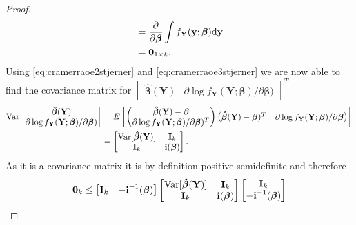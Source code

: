 \begin{proof}
\begin{align}
    &=\frac{\partial}{\partial \boldsymbol{\beta}} \int f_\textbf{Y}(\textbf{y};\boldsymbol{\beta}) \text{d\textbf{y}} \nonumber \\
    &= \textbf{0}_{1 \times k} \label{eq:cramerraoe3stjerner}.
\end{align}
Using \eqref{eq:cramerraoe2stjerner} and \eqref{eq:cramerraoe3stjerner} we are now able to find the covariance matrix for $\begin{bmatrix} \boldsymbol{\hat{\beta}}(\textbf{Y}) & \partial \log f_\textbf{Y}(\textbf{Y};\boldsymbol{\beta})/\partial \boldsymbol{\beta}) \end{bmatrix}^T$
\begin{align*}
    \operatorname{\text{Var}} \begin{bmatrix}  \boldsymbol{\hat{\beta}}(\textbf{Y}) \\  \partial \log f_\textbf{Y}(\textbf{Y};\boldsymbol{\beta})/\partial \boldsymbol{\beta}) \end{bmatrix} &= E \begin{bmatrix} \begin{pmatrix} \boldsymbol{\hat{\beta}}(\textbf{Y})-\boldsymbol{\beta} \\  \partial \log f_\textbf{Y}(\textbf{Y};\boldsymbol{\beta})/\partial \boldsymbol{\beta})^T\end{pmatrix} \begin{pmatrix} \boldsymbol{\hat{\beta}}(\textbf{Y})-\boldsymbol{\beta})^T &  \partial \log f_\textbf{Y}(\textbf{Y};\boldsymbol{\beta})/\partial \boldsymbol{\beta} \end{pmatrix}\end{bmatrix}  \\
    &= \begin{bmatrix} \operatorname{\text{Var}}[\boldsymbol{\hat{\beta}}(\textbf{Y})] & \textbf{I}_{k}\\
    \textbf{I}_{k} & \textbf{i}(\boldsymbol{\beta})\end{bmatrix}.
\end{align*}
As it is a covariance matrix it is by definition positive semidefinite and therefore
\begin{align*}
    \textbf{0}_{k} & \leq \begin{bmatrix} \textbf{I}_{k} & -\textbf{i}^{-1}(\boldsymbol{\beta})\end{bmatrix} \begin{bmatrix} \var[\boldsymbol{\hat{\beta}}(\textbf{Y})] & \textbf{I}_{k} \\ \textbf{I}_{k} & \textbf{i}(\boldsymbol{\beta}) \end{bmatrix}\begin{bmatrix} \textbf{I}_{k} \\ -\textbf{i}^{-1}(\boldsymbol{\beta})\end{bmatrix} \\

\end{align*}
\end{proof}
